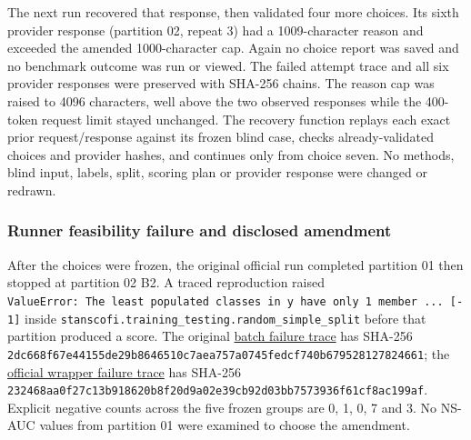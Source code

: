 \documentclass[
  10pt,
]{ctexart}
\begin{document}
The next run recovered that response, then validated four more choices.
Its sixth provider response (partition 02, repeat 3) had a
1009-character reason and exceeded the amended 1000-character cap. Again
no choice report was saved and no benchmark outcome was run or viewed.
The failed attempt trace and all six provider responses were preserved
with SHA-256 chains. The reason cap was raised to 4096 characters, well
above the two observed responses while the 400-token request limit
stayed unchanged. The recovery function replays each exact prior
request/response against its frozen blind case, checks already-validated
choices and provider hashes, and continues only from choice seven. No
methods, blind input, labels, split, scoring plan or provider response
were changed or redrawn.

\subsubsection{Runner feasibility failure and disclosed
amendment}\label{runner-feasibility-failure-and-disclosed-amendment}

After the choices were frozen, the original official run completed
partition 01 then stopped at partition 02 B2. A traced reproduction
raised
\texttt{ValueError:\ The\ least\ populated\ classes\ in\ y\ have\ only\ 1\ member\ .\allowbreak{}.\allowbreak{}.\allowbreak{}\ {[}-1{]}}
inside \texttt{stanscofi.\allowbreak{}training\_\allowbreak{}testing.\allowbreak{}random\_\allowbreak{}simple\_\allowbreak{}split} before
that partition produced a score. The original
\href{../artifacts/traces/20260926T153328294433Z_method_selection_partition_v2_benchmarks_0b04ca0f58ec49a7abdc38accf0a9e8a.jsonl}{batch
failure trace} has SHA-256
\texttt{2dc668f67e4415\allowbreak{}5de29b8646510c\allowbreak{}7aea757a0745fe\allowbreak{}dcf740b6795281\allowbreak{}27824661};
the
\href{../artifacts/traces/20260926T153805204265Z_recess_official_b2_1d011824597f421992787fb203859607.jsonl}{official
wrapper failure trace} has SHA-256
\texttt{232468aa0f27c1\allowbreak{}3b918620b8f20d\allowbreak{}9a02e39cb92d03\allowbreak{}bb7573936f61cf\allowbreak{}8ac199af}.
Explicit negative counts across the five frozen groups are 0, 1, 0, 7
and 3. No NS-AUC values from partition 01 were examined to choose the
amendment.
\end{document}
